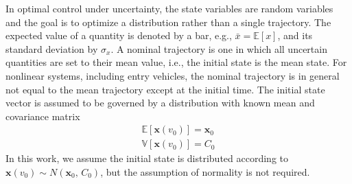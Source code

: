 \documentclass[journal ]{new-aiaa}
\newcommand{\state}{\ensuremath{\mathbf{x}}}
\newcommand{\E}[1]{\mathbb{E}\left[#1\right]}
\newcommand{\V}[1]{\mathbb{V}[#1]}
\newcommand{\cov}{C}
\begin{document}
In optimal control under uncertainty, the state variables are random variables and the goal is to optimize a distribution rather than a single trajectory. 
The expected value of a quantity is denoted by a bar, e.g., $\bar{x}=\E{x}$, and its standard deviation by $\sigma_{x}$. A nominal trajectory is one in which all uncertain quantities are set to their mean value, i.e., the initial state is the mean state. For nonlinear systems, including entry vehicles, the nominal trajectory is in general not equal to the mean trajectory except at the initial time. The initial state vector is assumed to be governed by a distribution with known mean and covariance matrix
\begin{align}
	\E{\state(v_0)} = \state_0 \label{eq_ic_mean}\\ 
	\V{\state(v_0)} = \cov_0 \label{eq_ic_cov}
\end{align}
In this work, we assume the initial state is distributed according to $\state(v_0)\sim N(\state_0,\,\cov_0)$, but the assumption of normality is not required. 
\end{document}
